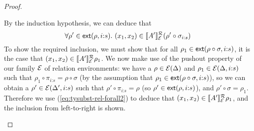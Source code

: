 \begin{proof}
\begin{enumerate}
\begin{description}
\begin{displaymath}
      \end{displaymath}
      By the induction hypothesis, we can deduce that
      \begin{equation}
        \label{eq:tysubst-rel-forall2}
        \forall \rho' \in \mathsf{ext}(\rho,i\mathord:s).\ (x_1,x_2) \in \llbracket A' \rrbracket^{\mathcal{R}}_{\mathcal{E}}{(\rho' \circ \sigma_{i\mathord:s})}
      \end{equation}
      To show the required inclusion, we must show that for all
      $\rho_1 \in \mathsf{ext}(\rho \circ \sigma,i\mathord:s)$, it is the
      case that $(x_1,x_2) \in \llbracket A' \rrbracket^{\mathcal{R}}_{\mathcal{E}}{\rho_1}$. We now
      make use of the pushout property of our family $\mathcal{E}$ of
      relation environments: we have a $\rho \in \mathcal{E}(\Delta)$
      and $\rho_1 \in \mathcal{E}(\Delta, i\mathord:s)$ such that
      $\rho_1 \circ \pi_{i\mathord:s} = \rho \circ \sigma$ (by the
      assumption that $\rho_1 \in \mathsf{ext}(\rho \circ
        \sigma,i\mathord:s)$), so we can obtain a $\rho' \in
      \mathcal{E}(\Delta',i\mathord:s)$ such that $\rho' \circ
      \pi_{i\mathord:s} = \rho$ (so $\rho' \in
      \mathsf{ext}(\rho,i\mathord:s)$), and $\rho' \circ \sigma =
      \rho_1$. Therefore we use (\ref{eq:tysubst-rel-forall2}) to
      deduce that $(x_1,x_2) \in \llbracket A' \rrbracket^{\mathcal{R}}_{\mathcal{E}}{\rho_1}$, and
      the inclusion from left-to-right is shown.


\end{description}
\end{enumerate}
\end{proof}
